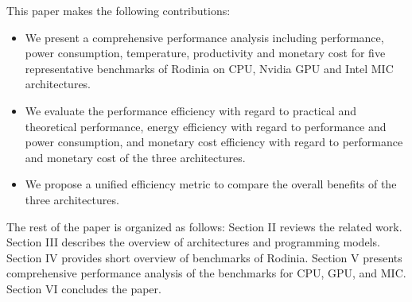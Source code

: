 This paper makes the following contributions: 
  
\begin{itemize}    
\item  We present a comprehensive performance analysis including performance, power consumption, temperature, productivity and monetary cost for five representative benchmarks of Rodinia on CPU, Nvidia GPU and Intel MIC architectures.    
\item  We evaluate the performance efficiency with regard to practical and theoretical performance, energy efficiency with regard to performance and power consumption, and monetary cost efficiency with regard to performance and monetary cost of the three architectures.    
\item  We propose a unified efficiency metric to compare the overall benefits of the three architectures.
\end{itemize}

The rest of the paper is organized as follows: Section II reviews the related work. Section III describes the overview of architectures and programming models. Section IV provides short overview of benchmarks of Rodinia. Section V presents comprehensive performance analysis of the benchmarks for CPU, GPU, and MIC. Section VI concludes the paper.